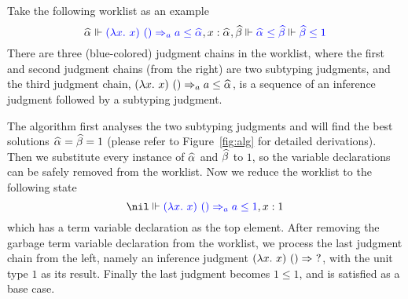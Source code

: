 Take the following worklist as an example
$$\al \Vdash \blue{(\lam x)~() \To_a a \le \al} , x:\al, \bt \Vdash \blue{\al \le \bt} \Vdash \blue{\bt \le 1}$$
There are three (blue-colored) judgment chains in the worklist,
where the first and second judgment chains (from the right) are two subtyping judgments,
and the third judgment chain, $(\lam x)~() \To_a a \le \al$,
is a sequence of an inference judgment followed by a subtyping judgment.

The algorithm first analyses the two subtyping judgments and
will find the best solutions $\al = \bt = 1$
(please refer to Figure~\ref{fig:alg} for detailed derivations).
Then we substitute every instance of $\al$ and $\bt$ to $1$,
so the variable declarations can be safely removed from the worklist.
Now we reduce the worklist to the following state
$$\nil \Vdash \blue{(\lam x)~() \To_a a \le 1}, x:1$$
which has a term variable declaration as the top element.
After removing the garbage term variable declaration from the worklist, we process the last judgment chain from the left,
namely an inference judgment $(\lam x)~()\To~?$, with the unit type $1$ as its result.
Finally the last judgment becomes $1 \le 1$, and is satisfied as a base case.




